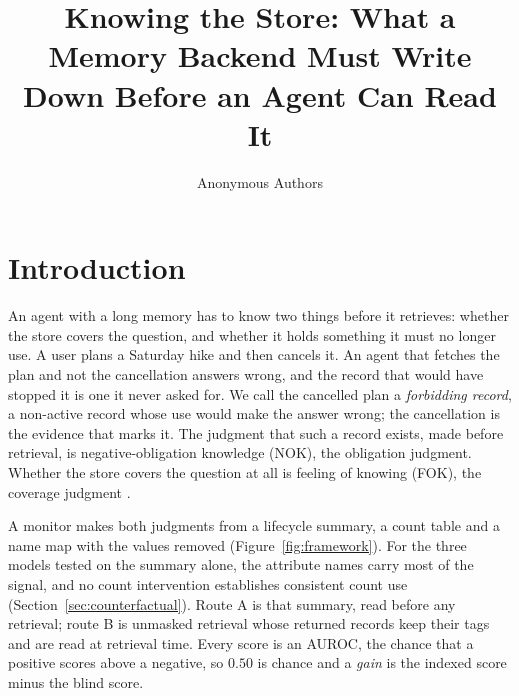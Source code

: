 \documentclass{article}
\title{Knowing the Store: What a Memory Backend Must Write Down Before an Agent Can Read It}
\author{Anonymous Authors}
\begin{document}
\maketitle


\section{Introduction}\label{sec:intro}

An agent with a long memory has to know two things before it retrieves: whether the store covers the question, and whether it holds something it must no longer use.
A user plans a Saturday hike and then cancels it.
An agent that fetches the plan and not the cancellation answers wrong, and the record that would have stopped it is one it never asked for.
We call the cancelled plan a \emph{forbidding record}, a non-active record whose use would make the answer wrong; the cancellation is the evidence that marks it.
The judgment that such a record exists, made before retrieval, is negative-obligation knowledge (NOK), the obligation judgment.
Whether the store covers the question at all is feeling of knowing (FOK), the coverage judgment \citep{hart1965,nelson1990,koriat1993}.

A monitor makes both judgments from a lifecycle summary, a count table and a name map with the values removed (Figure~\ref{fig:framework}).
For the three models tested on the summary alone, the attribute names carry most of the signal, and no count intervention establishes consistent count use (Section~\ref{sec:counterfactual}).
Route A is that summary, read before any retrieval; route B is unmasked retrieval whose returned records keep their tags and are read at retrieval time.
Every score is an AUROC, the chance that a positive scores above a negative, so $0.50$ is chance and a \emph{gain} is the indexed score minus the blind score.
\end{document}
